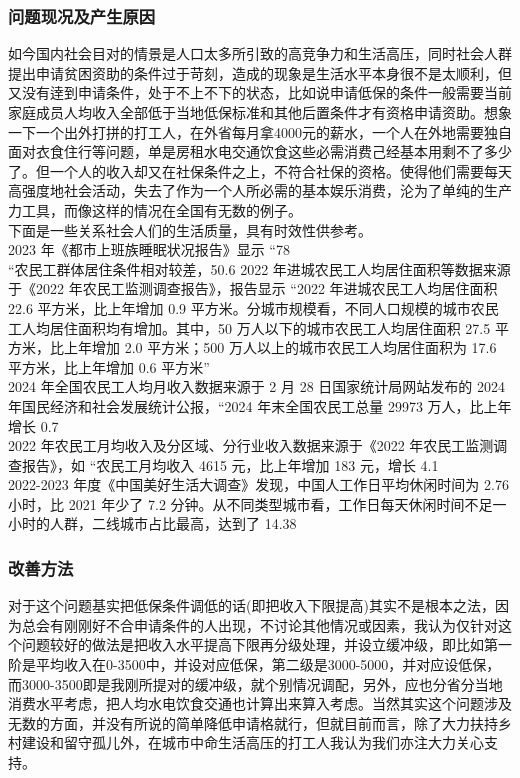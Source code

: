 \documentclass[supercite]{Experimental_Report}
\theoremstyle{definition}
\begin{document}
		\subsubsection{问题现况及产生原因}
		如今国内社会目对的情景是人口太多所引致的高竞争力和生活高压，同时社会人群提出申请贫困资助的条件过于苛刻，造成的现象是生活水平本身很不是太顺利，但又没有逹到申请条件，处于不上不下的状态，比如说申请低保的条件一般需要当前家庭成员人均收入全部低于当地低保标准和其他后置条件才有资格申请资助。想象一下一个出外打拼的打工人，在外省每月拿4000元的薪水，一个人在外地需要独自面对衣食住行等问题，单是房租水电交通饮食这些必需消费己经基本用剩不了多少了。但一个人的收入却又在社保条件之上，不符合社保的资格。使得他们需要每天高强度地社会活动，失去了作为一个人所必需的基本娱乐消费，沦为了单纯的生产力工具，而像这样的情况在全国有无数的例子。
		\\下面是一些关系社会人们的生活质量，具有时效性供参考。
		\\2023 年《都市上班族睡眠状况报告》显示 “78%
		\\“农民工群体居住条件相对较差，50.6%
		2022 年进城农民工人均居住面积等数据来源于《2022 年农民工监测调查报告》，报告显示 “2022 年进城农民工人均居住面积 22.6 平方米，比上年增加 0.9 平方米。分城市规模看，不同人口规模的城市农民工人均居住面积均有增加。其中，50 万人以下的城市农民工人均居住面积 27.5 平方米，比上年增加 2.0 平方米；500 万人以上的城市农民工人均居住面积为 17.6 平方米，比上年增加 0.6 平方米”
		\\2024 年全国农民工人均月收入数据来源于 2 月 28 日国家统计局网站发布的 2024 年国民经济和社会发展统计公报，“2024 年末全国农民工总量 29973 万人，比上年增长 0.7%
		\\2022 年农民工月均收入及分区域、分行业收入数据来源于《2022 年农民工监测调查报告》，如 “农民工月均收入 4615 元，比上年增加 183 元，增长 4.1%
		\\2022-2023 年度《中国美好生活大调查》发现，中国人工作日平均休闲时间为 2.76 小时，比 2021 年少了 7.2 分钟。从不同类型城市看，工作日每天休闲时间不足一小时的人群，二线城市占比最高，达到了 14.38%
		\subsubsection{改善方法}
		对于这个问题基实把低保条件调低的话(即把收入下限提高)其实不是根本之法，因为总会有刚刚好不合申请条件的人出现，不讨论其他情况或因素，我认为仅针对这个问题较好的做法是把收入水平提高下限再分级处理，并设立缓冲级，即比如第一阶是平均收入在0-3500中，并设对应低保，第二级是3000-5000，并对应设低保，而3000-3500即是我刚所提对的缓冲级，就个别情况调配，另外，应也分省分当地消费水平考虑，把人均水电饮食交通也计算出来算入考虑。当然其实这个问题涉及无数的方面，并没有所说的简单降低申请格就行，但就目前而言，除了大力扶持乡村建设和留守孤儿外，在城市中命生活高压的打工人我认为我们亦注大力关心支持。
		
\end{document}
